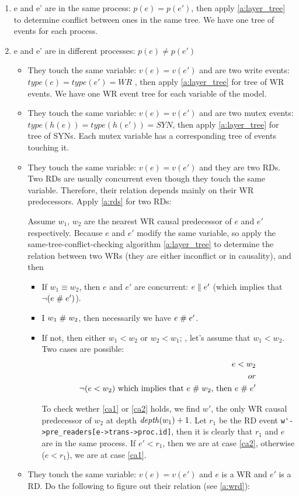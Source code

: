 \documentclass{llncs}
\begin{document}
\begin{enumerate}
	\item e and e' are in the same process: $p(e) = p(e')$, then apply \cref{a:layer_tree} to determine conflict between ones in the same tree. We have one tree of events for each process.
	\item e and e' are in different processes: $p(e)\neq p(e')$
	\begin{itemize}
		\item
		They touch the same variable: $v(e) = v(e')$ and are two write events: $ type(e) = type(e') = WR$ , then apply \cref{a:layer_tree} for tree of WR events. We have one WR event tree for each variable of the model. 
		\item
		They touch the same variable: $v(e) = v(e')$ and are two mutex events: $ type(h(e)) = type(h(e')) = SYN$, then apply \cref{a:layer_tree} for tree of SYNs. Each mutex variable has  a corresponding tree of events touching it.
		\item
		They touch the same variable: $v(e) = v(e')$ and they are two RDs. Two RDs are usually concurrent even though they touch the same variable. Therefore, their relation depends mainly on their WR predecessors. Apply \cref{a:rds} for two RDs: 
		
		Assume $w_1$, $w_2$ are the nearest WR causal predecessor of $e$ and $e'$ respectively. Because $e$ and $e'$ modify the same variable, so apply the same-tree-conflict-checking algorithm \cref{a:layer_tree} to determine the relation
		between two WRs (they are either inconflict or in causality), and then
		\begin{itemize}
			\item
			If $w_1 \equiv w_2$, then $e$ and $e'$ are concurrent: $e \mathrel{\parallel} e'$ (which implies that $\lnot (e \mathrel{\#} e')$).
			\item
			I $w_1 \mathrel{\#} w_2$, then necessarily we have $e \mathrel{\#} e'$.
			\item
			If not, then either $w_1 < w_2$ or $w_2 < w_1$; \wlogg, let's assume that $w_1 < w_2$.
			Two cases are possible:
			\begin{align}
				e < w_2 \label{ca1} \\
				or \nonumber \\
				\lnot (e < w_2) \text{ which implies that } e \cfl w_2 \text{, then } e \cfl e' \label{ca2}
			\end{align}
			
			To check wether \eqref{ca1} or \eqref{ca2} holds, we find $w'$, the only WR causal predecessor of $w_2$ at depth $\mathop{\mathit{depth}} (w_1) + 1$.
			Let $r_1$ be the RD event 
			\verb!w'->pre_readers[e->trans->proc.id]!, then it is clearly that $r_1$ and $e$ are in the same process.
			If $ e' < r_1$, then we are at case \eqref{ca2}, otherwise ($e < r_1$), we are at case \eqref{ca1}.
		\end{itemize}
		\item 
		They touch the same variable: $v(e) = v(e')$ and $e$ is a WR and $e'$ is a RD. Do the following to figure out their relation (see \cref{a:wrd}):
		

\end{itemize}
\end{enumerate}
\end{document}
